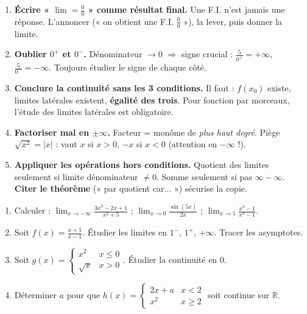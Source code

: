 \documentclass[11pt]{article}
\begin{document}
\begin{attention}
\begin{enumerate}
\item \textbf{Écrire « $\lim = \frac{0}{0}$ » comme résultat final.} Une F.I. n'est jamais une réponse. L'annoncer (« on obtient une F.I. $\frac{0}{0}$ »), la lever, puis donner la limite.
\item \textbf{Oublier $0^+$ et $0^-$.} Dénominateur $\to 0$ $\Rightarrow$ signe crucial : $\frac{5}{0^+}=+\infty$, $\frac{5}{0^-}=-\infty$. Toujours étudier le signe de chaque côté.
\item \textbf{Conclure la continuité sans les 3 conditions.} Il faut : $f(x_0)$ existe, limites latérales existent, \textbf{égalité des trois}. Pour fonction par morceaux, l'étude des limites latérales est obligatoire.
\item \textbf{Factoriser mal en $\pm\infty$.} Facteur = monôme de \emph{plus haut degré}. Piège $\sqrt{x^2}=|x|$ : vaut $x$ si $x>0$, $-x$ si $x<0$ (attention en $-\infty$ !).
\item \textbf{Appliquer les opérations hors conditions.} Quotient des limites seulement si limite dénominateur $\neq 0$. Somme seulement si pas $\infty-\infty$. \textbf{Citer le théorème} (« par quotient car... ») sécurise la copie.
\end{enumerate}
\end{attention}

\begin{exercice}
\begin{enumerate}
\item Calculer : $\lim_{x\to -\infty}\frac{3x^3-2x+1}{x^2+5}$ ; $\lim_{x\to 0}\frac{\sin(5x)}{2x}$ ; $\lim_{x\to 1}\frac{x^3-1}{x^2-1}$.
\item Soit $f(x)=\frac{x+1}{x-1}$. Étudier les limites en $1^-$, $1^+$, $+\infty$. Tracer les asymptotes.
\item Soit $g(x)=\begin{cases} x^2 & x\leq 0 \\ \sqrt{x} & x>0 \end{cases}$. Étudier la continuité en $0$.
\item Déterminer $a$ pour que $h(x)=\begin{cases} 2x+a & x<2 \\ x^2 & x\geq 2 \end{cases}$ soit continue sur $\mathbb{R}$.
\end{enumerate}
\end{exercice}
\end{document}
